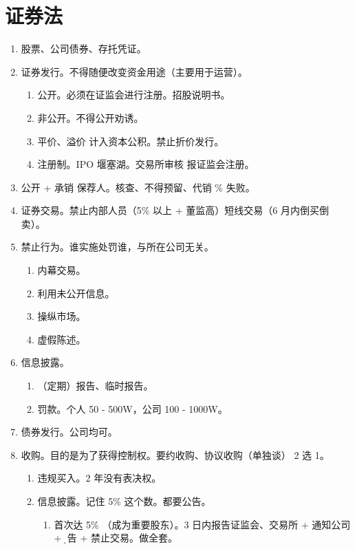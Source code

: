 \section{证券法}
\begin{enumerate}
  \item 股票、公司债券、存托凭证。
  \item 证券发行。不得随便改变资金用途（主要用于运营）。
        \begin{enumerate}
          \item 公开。必须在证监会进行注册。招股说明书。
          \item 非公开。不得公开劝诱。
          \item 平价、溢价 \yjt 计入资本公积。禁止折价发行。
          \item 注册制。IPO 堰塞湖。交易所审核 \yjt 报证监会注册。
        \end{enumerate}
  \item 公开 + 承销 \yjt 保荐人。核查、不得预留、代销 \% 失败。
  \item 证券交易。禁止内部人员（5\% 以上 + 董监高）短线交易（6 月内倒买倒卖）。
  \item 禁止行为。谁实施处罚谁，与所在公司无关。
        \begin{enumerate}
          \item 内幕交易。
          \item 利用未公开信息。
          \item 操纵市场。
          \item 虚假陈述。
        \end{enumerate}
  \item 信息披露。
        \begin{enumerate}
          \item （定期）报告、临时报告。
          \item 罚款。个人 50 - 500W，公司 100 - 1000W。
        \end{enumerate}
  \item 债券发行。公司均可。
  \item 收购。目的是为了获得控制权。要约收购、协议收购（单独谈） 2 选 1。
        \begin{enumerate}
          \item 违规买入。2 年没有表决权。
          \item 信息披露。记住 5\% 这个数。都要公告。
                \begin{enumerate}
                  \item 首次达 5\% （成为重要股东）。3 日内报告证监会、交易所 + 通知公司 + \d{公告} + 禁止交易。做全套。

\end{enumerate}
\end{enumerate}
\end{enumerate}
